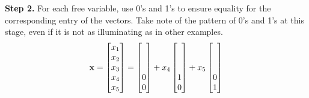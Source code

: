 \documentclass{ximera}
\begin{document}
\begin{example}
  \textbf{Step 2.}  For each free variable, use 0's and 1's to ensure
  equality for the corresponding entry of the vectors.  Take note of
  the pattern of 0's and 1's at this stage, even if it is not as
  illuminating as in other examples.
  \[
    \mathbf{x}=\begin{bmatrix}x_1\\x_2\\x_3\\x_4\\x_5\end{bmatrix}=
    \begin{bmatrix}\ \\\ \\\ \\0\\0\end{bmatrix}+
    x_4\begin{bmatrix}\ \\\ \\\ \\1\\0\end{bmatrix}+
    x_5\begin{bmatrix}\ \\\ \\\ \\0\\1\end{bmatrix}
  \]


\end{example}
\end{document}
